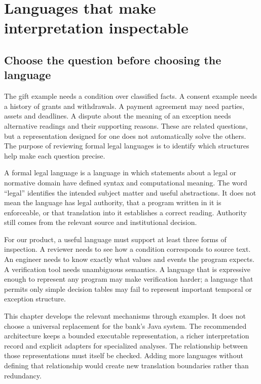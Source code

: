 \documentclass[12pt,a4paper,oneside,openany]{book}
\begin{document}
\chapter{Languages that make interpretation inspectable}
\label{ch:languages}

\section{Choose the question before choosing the language}
\label{merge:M04:00}

\label{sec:languages-question}
The gift example needs a condition over classified facts. A consent example
needs a history of grants and withdrawals. A payment agreement may need parties,
assets and deadlines. A dispute about the meaning of an exception needs
alternative readings and their supporting reasons. These are related questions,
but a representation designed for one does not automatically solve the others.
The purpose of reviewing formal legal languages is to identify which structures
help make each question precise.

A formal legal language is a language in which statements about a legal or
normative domain have defined syntax and computational meaning. The word
``legal'' identifies the intended subject matter and useful abstractions. It
does not mean the language has legal authority, that a program written in it
is enforceable, or that translation into it establishes a correct reading.
Authority still comes from the relevant source and institutional decision.

For our product, a useful language must support at least three forms of
inspection. A reviewer needs to see how a condition corresponds to source
text. An engineer needs to know exactly what values and events the program
expects. A verification tool needs unambiguous semantics. A language that is
expressive enough to represent any program may make verification harder; a
language that permits only simple decision tables may fail to represent
important temporal or exception structure.

This chapter develops the relevant mechanisms through examples. It does not
choose a universal replacement for the bank's Java system. The recommended
architecture keeps a bounded executable representation, a richer interpretation
record and explicit adapters for specialized analyses. The relationship between
those representations must itself be checked. Adding more languages without
defining that relationship would create new translation boundaries rather than
redundancy.
\end{document}
